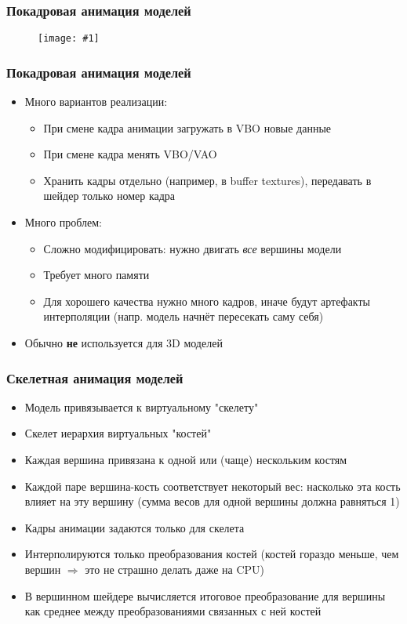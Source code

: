 \documentclass{beamer}
\newcommand{\slideimage}[1]{
  \begin{figure}
    \begin{adjustbox}{width=\textwidth, totalheight=\textheight-2\baselineskip-2\baselineskip,keepaspectratio}
      \texttt{[image: \#1]}
    \end{adjustbox}
  \end{figure}
}
\begin{document}
\begin{frame}[fragile]
\frametitle{Покадровая анимация моделей}
\slideimage{keyframes.jpg}
\end{frame}

\begin{frame}[fragile]
\frametitle{Покадровая анимация моделей}
\begin{itemize}
\item Много вариантов реализации:
\begin{itemize}
\item При смене кадра анимации загружать в VBO новые данные
\item При смене кадра менять VBO/VAO
\item Хранить кадры отдельно (например, в buffer textures), передавать в шейдер только номер кадра
\end{itemize}
\pause
\item Много проблем:
\begin{itemize}
\item Сложно модифицировать: нужно двигать \textit{все} вершины модели
\item Требует много памяти
\item Для хорошего качества нужно много кадров, иначе будут артефакты интерполяции (напр. модель начнёт пересекать саму себя)
\end{itemize}
\pause
\item Обычно \textbf{не} используется для 3D моделей
\end{itemize}
\end{frame}

\begin{frame}[fragile]
\frametitle{Скелетная анимация моделей}
\begin{itemize}
\item Модель привязывается к виртуальному "скелету"
\pause
\item Скелет \textendash{} иерархия виртуальных "костей"
\pause
\item Каждая вершина привязана к одной или (чаще) нескольким костям
\pause
\item Каждой паре вершина-кость соответствует некоторый вес: насколько эта кость влияет на эту вершину (сумма весов для одной вершины должна равняться 1)
\pause
\item Кадры анимации задаются только для скелета
\pause
\item Интерполируются только преобразования костей (костей гораздо меньше, чем вершин \begin{math}\Rightarrow\end{math} это не страшно делать даже на CPU)
\pause
\item В вершинном шейдере вычисляется итоговое преобразование для вершины как среднее между преобразованиями связанных с ней костей
\end{itemize}
\end{frame}
\end{document}
